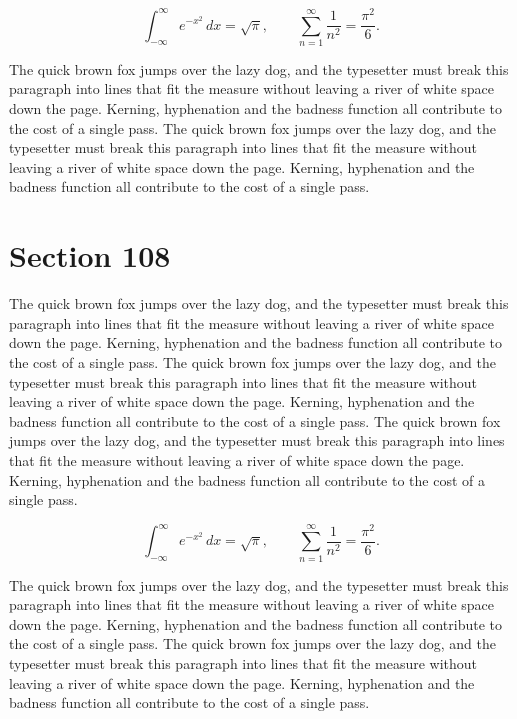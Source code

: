 \documentclass{article}
\begin{document}
\begin{equation}
\int_{-\infty}^{\infty} e^{-x^{2}}\,dx = \sqrt{\pi}, \qquad
\sum_{n=1}^{\infty} \frac{1}{n^{2}} = \frac{\pi^{2}}{6}.
\end{equation}

The quick brown fox jumps over the lazy dog, and the typesetter must break this paragraph into lines that fit the measure without leaving a river of white space down the page. Kerning, hyphenation and the badness function all contribute to the cost of a single pass. The quick brown fox jumps over the lazy dog, and the typesetter must break this paragraph into lines that fit the measure without leaving a river of white space down the page. Kerning, hyphenation and the badness function all contribute to the cost of a single pass. 
\section{Section 108}
The quick brown fox jumps over the lazy dog, and the typesetter must break this paragraph into lines that fit the measure without leaving a river of white space down the page. Kerning, hyphenation and the badness function all contribute to the cost of a single pass. The quick brown fox jumps over the lazy dog, and the typesetter must break this paragraph into lines that fit the measure without leaving a river of white space down the page. Kerning, hyphenation and the badness function all contribute to the cost of a single pass. The quick brown fox jumps over the lazy dog, and the typesetter must break this paragraph into lines that fit the measure without leaving a river of white space down the page. Kerning, hyphenation and the badness function all contribute to the cost of a single pass. 

\begin{equation}
\int_{-\infty}^{\infty} e^{-x^{2}}\,dx = \sqrt{\pi}, \qquad
\sum_{n=1}^{\infty} \frac{1}{n^{2}} = \frac{\pi^{2}}{6}.
\end{equation}

The quick brown fox jumps over the lazy dog, and the typesetter must break this paragraph into lines that fit the measure without leaving a river of white space down the page. Kerning, hyphenation and the badness function all contribute to the cost of a single pass. The quick brown fox jumps over the lazy dog, and the typesetter must break this paragraph into lines that fit the measure without leaving a river of white space down the page. Kerning, hyphenation and the badness function all contribute to the cost of a single pass. 
\end{document}
